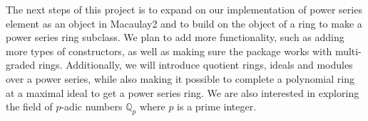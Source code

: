 \documentclass[11pt]{article}
\begin{document}
The next steps of this project is to expand on our implementation of
power series element as an object in Macaulay2 and to build on the
object of a ring to make a power series ring subclass. We plan to add
more functionality, such as adding more types of constructors, as well
as making sure the package works with multi-graded rings. Additionally,
we will introduce quotient rings, ideals and modules over a power
series, while also making it possible to complete a polynomial ring at a
maximal ideal to get a power series ring. We are also interested in
exploring the field of \(p\)-adic numbers \(\mathbb{Q}_p\) where \(p\)
is a prime integer.



    
\end{document}

